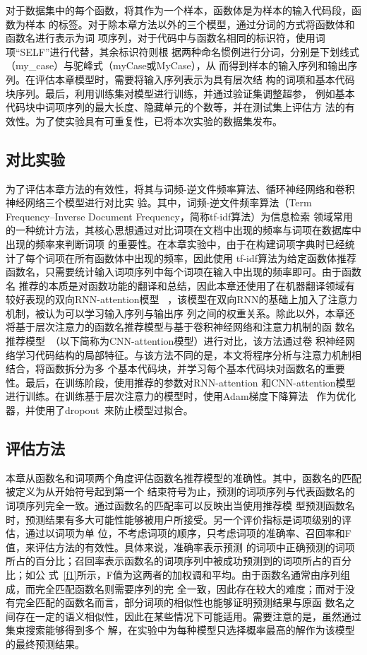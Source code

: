 对于数据集中的每个函数，将其作为一个样本，函数体是为样本的输入代码段，函数为样本
的标签。对于除本章方法以外的三个模型，通过分词的方式将函数体和函数名进行表示为词
项序列，对于代码中与函数名相同的标识符，使用词项``SELF''进行代替，其余标识符则根
据两种命名惯例进行分词，分别是下划线式（my\_case）与驼峰式（myCase或MyCase），从
而得到样本的输入序列和输出序列。在评估本章模型时，需要将输入序列表示为具有层次结
构的词项和基本代码块序列。最后，利用训练集对模型进行训练，并通过验证集调整超参，
例如基本代码块中词项序列的最大长度、隐藏单元的个数等，并在测试集上评估方
法的有效性。为了使实验具有可重复性，已将本次实验的数据集发布。

\subsection{对比实验}
为了评估本章方法的有效性，将其与词频-逆文件频率算法、循环神经网络和卷积神经网络三个模型进行对比实
验。其中，词频-逆文件频率算法（Term Frequency–Inverse Document Frequency，简称tf-idf算法）为信息检索
领域常用的一种统计方法，其核心思想通过对比词项在文档中出现的频率与词项在数据库中出现的频率来判断词项
的重要性。在本章实验中，由于在构建词项字典时已经统计了每个词项在所有函数体中出现的频率，因此使用
tf-idf算法为给定函数体推荐函数名，只需要统计输入词项序列中每个词项在输入中出现的频率即可。由于函数名
推荐的本质是对函数功能的翻译和总结，因此本章还使用了在机器翻译领域有较好表现的双向RNN-attention模型
~\cite{bahdanau2015neural}，该模型在双向RNN的基础上加入了注意力机制，被认为可以学习输入序列与输出序
列之间的权重关系。除此以外，本章还将基于层次注意力的函数名推荐模型与基于卷积神经网络和注意力机制的函
数名推荐模型~\cite{allamanis2016convolutional}（以下简称为CNN-attention模型）进行对比，该方法通过卷
积神经网络学习代码结构的局部特征。与该方法不同的是，本文将程序分析与注意力机制相结合，将函数拆分为多
个基本代码块，并学习每个基本代码块对函数名的重要性。最后，在训练阶段，使用推荐的参数对RNN-attention
和CNN-attention模型进行训练。在训练基于层次注意力的模型时，使用Adam梯度下降算法
~\cite{kingma2014adam}作为优化器，并使用了dropout~\cite{srivastava2014dropout}来防止模型过拟合。

\subsection{评估方法}
本章从函数名和词项两个角度评估函数名推荐模型的准确性。其中，函数名的匹配被定义为从开始符号起到第一个
结束符号为止，预测的词项序列与代表函数名的词项序列完全一致。通过函数名的匹配率可以反映出当使用推荐模
型预测函数名时，预测结果有多大可能性能够被用户所接受。另一个评价指标是词项级别的评估，通过以词项为单
位，不考虑词项的顺序，只考虑词项的准确率、召回率和F值，来评估方法的有效性。具体来说，准确率表示预测
的词项中正确预测的词项所占的百分比；召回率表示函数名的词项序列中被成功预测到的词项所占的百分比；如公
式~\ref{f1}所示，F值为这两者的加权调和平均。由于函数名通常由序列组成，而完全匹配函数名则需要序列的完
全一致，因此存在较大的难度；而对于没有完全匹配的函数名而言，部分词项的相似性也能够证明预测结果与原函
数名之间存在一定的语义相似性，因此在某些情况下可能适用。需要注意的是，虽然通过集束搜索能够得到多个
解，在实验中为每种模型只选择概率最高的解作为该模型的最终预测结果。

